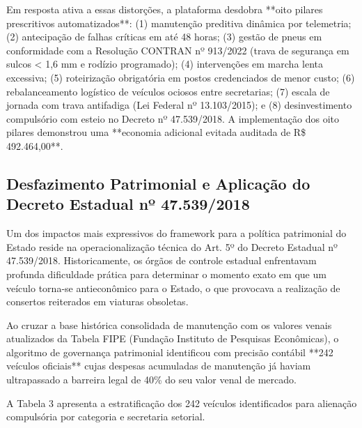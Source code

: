 \documentclass[12pt,a4paper]{article}
\begin{document}
Em resposta ativa a essas distorções, a plataforma desdobra **oito pilares prescritivos automatizados**: (1) manutenção preditiva dinâmica por telemetria; (2) antecipação de falhas críticas em até 48 horas; (3) gestão de pneus em conformidade com a Resolução CONTRAN nº 913/2022 (trava de segurança em sulcos < 1,6 mm e rodízio programado); (4) intervenções em marcha lenta excessiva; (5) roteirização obrigatória em postos credenciados de menor custo; (6) rebalanceamento logístico de veículos ociosos entre secretarias; (7) escala de jornada com trava antifadiga (Lei Federal nº 13.103/2015); e (8) desinvestimento compulsório com esteio no Decreto nº 47.539/2018. A implementação dos oito pilares demonstrou uma **economia adicional evitada auditada de R\$ 492.464,00**.


\subsection{Desfazimento Patrimonial e Aplicação do Decreto Estadual nº 47.539/2018}

Um dos impactos mais expressivos do framework para a política patrimonial do Estado reside na operacionalização técnica do Art. 5º do Decreto Estadual nº 47.539/2018. Historicamente, os órgãos de controle estadual enfrentavam profunda dificuldade prática para determinar o momento exato em que um veículo torna-se antieconômico para o Estado, o que provocava a realização de consertos reiterados em viaturas obsoletas.

Ao cruzar a base histórica consolidada de manutenção com os valores venais atualizados da Tabela FIPE (Fundação Instituto de Pesquisas Econômicas), o algoritmo de governança patrimonial identificou com precisão contábil **242 veículos oficiais** cujas despesas acumuladas de manutenção já haviam ultrapassado a barreira legal de 40\% do seu valor venal de mercado.

A Tabela 3 apresenta a estratificação dos 242 veículos identificados para alienação compulsória por categoria e secretaria setorial.
\end{document}
